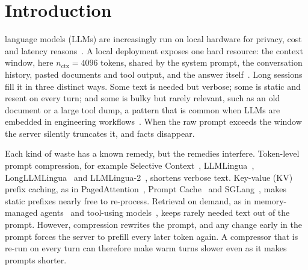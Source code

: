 \documentclass[journal]{IEEEtran}
\begin{document}
\section{Introduction}
 language models (LLMs) are increasingly run on local hardware for privacy, cost and latency
reasons~\cite{qu2025edge,schwartz2020green}. A local deployment exposes one hard resource: the context window, here
$n_\text{ctx}=4096$ tokens, shared by the system prompt, the conversation history, pasted documents and tool output, and the
answer itself~\cite{naveed2025overview,raiaan2024review}. Long sessions fill it in three distinct ways. Some text is needed but
verbose; some is static and resent on every turn; and some is bulky but rarely relevant, such as an old document or a large tool
dump, a pattern that is common when LLMs are embedded in engineering workflows~\cite{hou2024llm4se}. When the raw prompt exceeds
the window the server silently truncates it, and facts disappear.

Each kind of waste has a known remedy, but the remedies interfere. Token-level prompt compression, for example
Selective Context~\cite{li2023selective}, LLMLingua~\cite{jiang2023llmlingua}, LongLLMLingua~\cite{jiang2024longllmlingua} and
LLMLingua-2~\cite{pan2024llmlingua2}, shortens verbose text. Key-value (KV) prefix caching, as in
PagedAttention~\cite{kwon2023vllm}, Prompt Cache~\cite{gim2024promptcache} and SGLang~\cite{zheng2024sglang}, makes static
prefixes nearly free to re-process. Retrieval on demand, as in memory-managed agents~\cite{packer2023memgpt,zhang2025memory} and
tool-using models~\cite{schick2023toolformer,qin2024tool}, keeps rarely needed text out of the prompt. However, compression
rewrites the prompt, and any change early in the prompt forces the server to prefill every later token again. A compressor that
is re-run on every turn can therefore make warm turns slower even as it makes prompts shorter.
\end{document}
